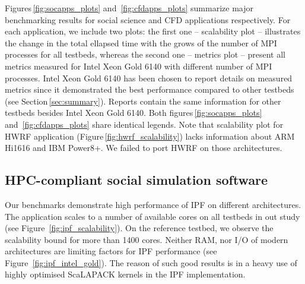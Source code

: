 Figures\,\ref{fig:socapps_plots} and~\ref{fig:cfdapps_plots} summarize major benchmarking results
for social science and CFD applications respectively.
For each application, we include two plots:
the first one -- scalability plot -- illustrates the change
in the total ellapsed time with the grows of the number of MPI processes for all testbeds,
whereas the second one -- metrics plot -- present all metrics measured for Intel Xeon Gold 6140 with different number of MPI processes.
Intel Xeon Gold 6140 has been  chosen to report details on measured metrics 
since it demonstrated the best performance compared to other testbeds (see Section\,\ref{sec:summary}).
Reports \cite{2017:coegss_benchmark1,2018:coegss_benchmark2} contain the same information
for other testbeds besides Intel Xeon Gold 6140.
Both figures\,\ref{fig:socapps_plots} and~\ref{fig:cfdapps_plots} share identical legends.
Note that scalability plot for HWRF application (Figure\,\ref{fig:hwrf_scalability}) lacks information about ARM Hi1616 and IBM Power8+.
We failed to port HWRF on those architectures.

\subsection{HPC-compliant social simulation software}


Our benchmarks demonstrate high performance of IPF on different  architectures.
The application scales to a number of available cores on all testbeds in out study (see Figure~\ref{fig:ipf_scalability}).
On the reference testbed, we observe the scalability bound for more than 1400 cores.
Neither  RAM, nor I/O of modern architectures are limiting factors for IPF performance (see Figure~\ref{fig:ipf_intel_gold}).
The reason of such good results is in a heavy use of highly optimised \textsf{ScaLAPACK} kernels in the IPF implementation.

